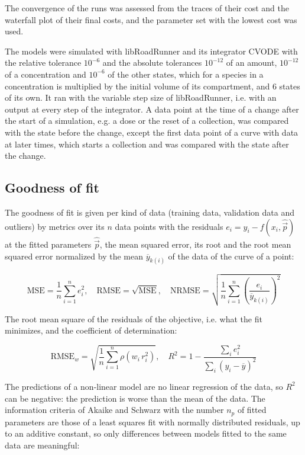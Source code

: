 \documentclass{article}
\begin{document}
The convergence of the runs was assessed from the traces of their cost and the waterfall plot of their final costs, and the parameter set with the lowest cost was used.

The models were simulated with libRoadRunner \cite{Welsh2023} and its integrator CVODE \cite{Hindmarsh2005} with the relative tolerance $10^{-6}$ and the absolute tolerances $10^{-12}$ of an amount, $10^{-12}$ of a concentration and $10^{-6}$ of the other states, which for a species in a concentration is multiplied by the initial volume of its compartment, and 6 states of its own. It ran with the variable step size of libRoadRunner, i.e. with an output at every step of the integrator. A data point at the time of a change after the start of a simulation, e.g. a dose or the reset of a collection, was compared with the state before the change, except the first data point of a curve with data at later times, which starts a collection and was compared with the state after the change.

\subsection{Goodness of fit}

The goodness of fit is given per kind of data (training data, validation data and outliers) by metrics over its $n$ data points with the residuals $e_i = y_i - f(x_i, \hat{\vec{p}})$ at the fitted parameters $\hat{\vec{p}}$, the mean squared error, its root and the root mean squared error normalized by the mean $\overline{y}_{k(i)}$ of the data of the curve of a point:

\begin{equation}
\mathrm{MSE} = \frac{1}{n} \sum_{i=1}^{n} e_i^2, \quad \mathrm{RMSE} = \sqrt{\mathrm{MSE}}, \quad \mathrm{NRMSE} = \sqrt{\frac{1}{n} \sum_{i=1}^{n} \left(\frac{e_i}{\overline{y}_{k(i)}}\right)^2}
\end{equation}

The root mean square of the residuals of the objective, i.e. what the fit minimizes, and the coefficient of determination:

\begin{equation}
\mathrm{RMSE}_w = \sqrt{\frac{1}{n} \sum_{i=1}^{n} \rho\left(w_i\, r_i^2\right)}, \quad R^2 = 1 - \frac{\sum_{i} e_i^2}{\sum_{i} \left(y_i - \overline{y}\right)^2}
\end{equation}

The predictions of a non-linear model are no linear regression of the data, so $R^2$ can be negative: the prediction is worse than the mean of the data. The information criteria of Akaike \cite{Akaike1974} and Schwarz \cite{Schwarz1978} with the number $n_p$ of fitted parameters are those of a least squares fit with normally distributed residuals, up to an additive constant, so only differences between models fitted to the same data are meaningful:
\end{document}
